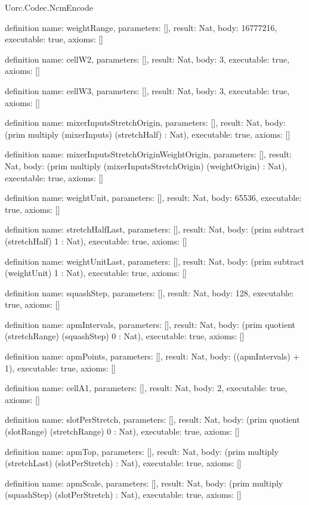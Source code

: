 \begin{lexlean}{Uorc.Codec.NcmEncode}
\begin{semanticmodule}
definition{
  name: weightRange,
  parameters: [],
  result: Nat,
  body: 16777216,
  executable: true,
  axioms: []
}

definition{
  name: cellW2,
  parameters: [],
  result: Nat,
  body: 3,
  executable: true,
  axioms: []
}

definition{
  name: cellW3,
  parameters: [],
  result: Nat,
  body: 3,
  executable: true,
  axioms: []
}

definition{
  name: mixerInputsStretchOrigin,
  parameters: [],
  result: Nat,
  body: (prim multiply (mixerInputs) (stretchHalf) : Nat),
  executable: true,
  axioms: []
}

definition{
  name: mixerInputsStretchOriginWeightOrigin,
  parameters: [],
  result: Nat,
  body: (prim multiply (mixerInputsStretchOrigin) (weightOrigin) : Nat),
  executable: true,
  axioms: []
}

definition{
  name: weightUnit,
  parameters: [],
  result: Nat,
  body: 65536,
  executable: true,
  axioms: []
}

definition{
  name: stretchHalfLast,
  parameters: [],
  result: Nat,
  body: (prim subtract (stretchHalf) 1 : Nat),
  executable: true,
  axioms: []
}

definition{
  name: weightUnitLast,
  parameters: [],
  result: Nat,
  body: (prim subtract (weightUnit) 1 : Nat),
  executable: true,
  axioms: []
}

definition{
  name: squashStep,
  parameters: [],
  result: Nat,
  body: 128,
  executable: true,
  axioms: []
}

definition{
  name: apmIntervals,
  parameters: [],
  result: Nat,
  body: (prim quotient (stretchRange) (squashStep) 0 : Nat),
  executable: true,
  axioms: []
}

definition{
  name: apmPoints,
  parameters: [],
  result: Nat,
  body: ((apmIntervals) + 1),
  executable: true,
  axioms: []
}

definition{
  name: cellA1,
  parameters: [],
  result: Nat,
  body: 2,
  executable: true,
  axioms: []
}

definition{
  name: slotPerStretch,
  parameters: [],
  result: Nat,
  body: (prim quotient (slotRange) (stretchRange) 0 : Nat),
  executable: true,
  axioms: []
}

definition{
  name: apmTop,
  parameters: [],
  result: Nat,
  body: (prim multiply (stretchLast) (slotPerStretch) : Nat),
  executable: true,
  axioms: []
}

definition{
  name: apmScale,
  parameters: [],
  result: Nat,
  body: (prim multiply (squashStep) (slotPerStretch) : Nat),
  executable: true,
  axioms: []
}


\end{semanticmodule}
\end{lexlean}
